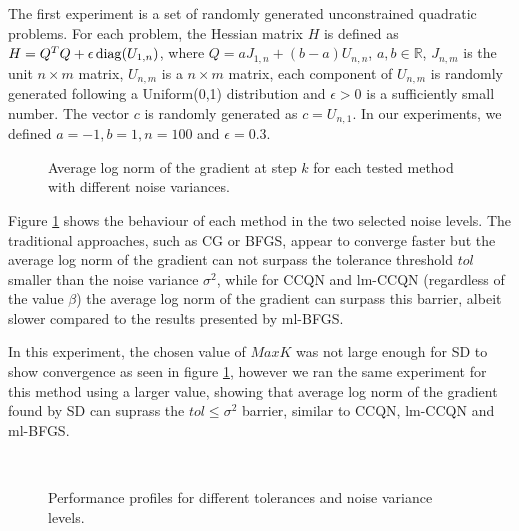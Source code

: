 \documentclass[11pt,twoside]{article}
\begin{document}
The first experiment is a set of randomly generated unconstrained quadratic problems. For each problem, the Hessian matrix $H$ is defined as $H = Q^T Q + \epsilon \diag(U_{1,n})$, where $Q = a J_{1,n} + (b-a) U_{n,n}$, $a,b \in \mathbb{R}$,  $J_{n,m}$ is the unit $n\times m$ matrix, $U_{n,m}$ is a $n \times m$ matrix, each component of $U_{n,m}$ is randomly generated following a Uniform(0,1) distribution and $\epsilon>0$ is a sufficiently small number. The vector $c$ is randomly generated as $c = U_{n,1}$. In our experiments, we defined $a=-1, b=1, n = 100$ and $\epsilon = 0.3$.

\begin{figure}[H]
                \centering
                \qquad
                 \caption{Average log norm of the gradient at step $k$ for each tested method with different noise variances.}
                \label{graph:models-lognorm}
\end{figure}

Figure \ref{graph:models-lognorm} shows the behaviour of each method in the two selected noise levels. The traditional approaches, such as CG or BFGS, appear to converge faster but the average log norm of the gradient can not surpass the tolerance threshold $tol $ smaller than the noise variance $\sigma^2$, while for CCQN and lm-CCQN (regardless of the value $\beta$) the average log norm of the gradient can surpass this barrier, albeit slower compared to the results presented by ml-BFGS.

In this experiment, the chosen value of $MaxK$ was not large enough for SD to show convergence as seen in figure \ref{graph:models-lognorm}, however we ran the same experiment for this method using a larger value, showing that average log norm of the gradient found by SD can suprass the $tol \le \sigma^2$ barrier, similar to CCQN, lm-CCQN and ml-BFGS.

\captionsetup[subfigure]{labelformat=empty}
\begin{figure}[H]
                \centering
                \qquad
                \\
                \qquad
                 \caption{Performance profiles for different tolerances and noise variance levels.}
                \label{graph:models-pp}
\end{figure}
\end{document}
